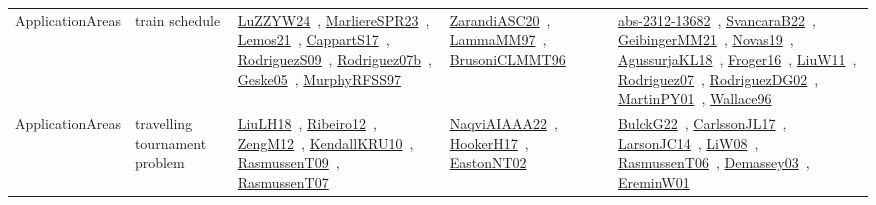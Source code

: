 {\begin{longtable}{lp{3cm}>{\raggedright\arraybackslash}p{6cm}>{\raggedright\arraybackslash}p{6cm}>{\raggedright\arraybackslash}p{8cm}}
\index{train schedule}\index{ApplicationAreas!train schedule}ApplicationAreas & train schedule & \href{../works/LuZZYW24.pdf}{LuZZYW24}~\cite{LuZZYW24}, \href{../works/MarliereSPR23.pdf}{MarliereSPR23}~\cite{MarliereSPR23}, \href{../works/Lemos21.pdf}{Lemos21}~\cite{Lemos21}, \href{../works/CappartS17.pdf}{CappartS17}~\cite{CappartS17}, \href{../works/RodriguezS09.pdf}{RodriguezS09}~\cite{RodriguezS09}, \href{../works/Rodriguez07b.pdf}{Rodriguez07b}~\cite{Rodriguez07b}, \href{../works/Geske05.pdf}{Geske05}~\cite{Geske05}, \href{../works/MurphyRFSS97.pdf}{MurphyRFSS97}~\cite{MurphyRFSS97} & \href{../works/ZarandiASC20.pdf}{ZarandiASC20}~\cite{ZarandiASC20}, \href{../works/LammaMM97.pdf}{LammaMM97}~\cite{LammaMM97}, \href{../works/BrusoniCLMMT96.pdf}{BrusoniCLMMT96}~\cite{BrusoniCLMMT96} & \href{../works/abs-2312-13682.pdf}{abs-2312-13682}~\cite{abs-2312-13682}, \href{../works/SvancaraB22.pdf}{SvancaraB22}~\cite{SvancaraB22}, \href{../works/GeibingerMM21.pdf}{GeibingerMM21}~\cite{GeibingerMM21}, \href{../works/Novas19.pdf}{Novas19}~\cite{Novas19}, \href{../works/AgussurjaKL18.pdf}{AgussurjaKL18}~\cite{AgussurjaKL18}, \href{../works/Froger16.pdf}{Froger16}~\cite{Froger16}, \href{../works/LiuW11.pdf}{LiuW11}~\cite{LiuW11}, \href{../works/Rodriguez07.pdf}{Rodriguez07}~\cite{Rodriguez07}, \href{../works/RodriguezDG02.pdf}{RodriguezDG02}~\cite{RodriguezDG02}, \href{../works/MartinPY01.pdf}{MartinPY01}~\cite{MartinPY01}, \href{../works/Wallace96.pdf}{Wallace96}~\cite{Wallace96}\\
\index{travelling tournament problem}\index{ApplicationAreas!travelling tournament problem}ApplicationAreas & travelling tournament problem & \href{../works/LiuLH18.pdf}{LiuLH18}~\cite{LiuLH18}, \href{../works/Ribeiro12.pdf}{Ribeiro12}~\cite{Ribeiro12}, \href{../works/ZengM12.pdf}{ZengM12}~\cite{ZengM12}, \href{../works/KendallKRU10.pdf}{KendallKRU10}~\cite{KendallKRU10}, \href{../works/RasmussenT09.pdf}{RasmussenT09}~\cite{RasmussenT09}, \href{../works/RasmussenT07.pdf}{RasmussenT07}~\cite{RasmussenT07} & \href{../works/NaqviAIAAA22.pdf}{NaqviAIAAA22}~\cite{NaqviAIAAA22}, \href{../works/HookerH17.pdf}{HookerH17}~\cite{HookerH17}, \href{../works/EastonNT02.pdf}{EastonNT02}~\cite{EastonNT02} & \href{../works/BulckG22.pdf}{BulckG22}~\cite{BulckG22}, \href{../works/CarlssonJL17.pdf}{CarlssonJL17}~\cite{CarlssonJL17}, \href{../works/LarsonJC14.pdf}{LarsonJC14}~\cite{LarsonJC14}, \href{../works/LiW08.pdf}{LiW08}~\cite{LiW08}, \href{../works/RasmussenT06.pdf}{RasmussenT06}~\cite{RasmussenT06}, \href{../works/Demassey03.pdf}{Demassey03}~\cite{Demassey03}, \href{../works/EreminW01.pdf}{EreminW01}~\cite{EreminW01}\\

\end{longtable}}
